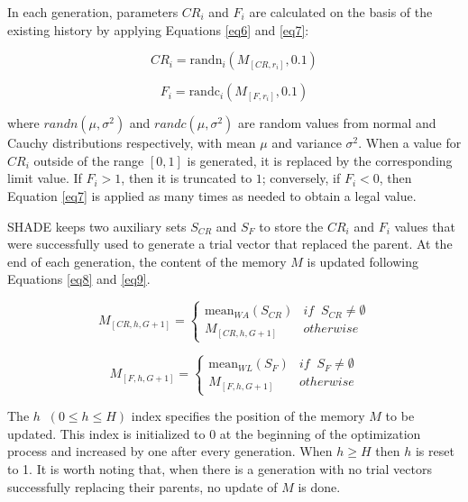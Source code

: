 \documentclass[review]{elsarticle}
\begin{document}
In each generation, parameters $CR_i$ and $F_i$ are calculated on the basis of the existing history by applying Equations \eqref{eq6} and \eqref{eq7}:

\begin{equation}
CR_i = \text{randn}_i(M_{[CR,r_i]}, 0.1)
\label{eq6}
\end{equation}

\begin{equation}
F_i = \text{randc}_i(M_{[F,r_i]}, 0.1)
\label{eq7}
\end{equation}

where $randn(\mu, \sigma^2)$ and $randc(\mu, \sigma^2)$ are random values from normal and Cauchy distributions respectively, with mean $\mu$ and variance $\sigma^2$. When a value for $CR_i$ outside of the range $[0,1]$ is generated, it is replaced by the corresponding limit value. If $F_i > 1$, then it is truncated to $1$; conversely, if $F_i < 0$, then Equation \eqref{eq7} is applied as many times as needed to obtain a legal value.

SHADE keeps two auxiliary sets $S_{CR}$ and $S_F$ to store the $CR_i$ and $F_i$ values that were successfully used to generate a trial vector that replaced the parent. At the end of each generation, the content of the memory $M$ is updated following Equations \eqref{eq8} and \eqref{eq9}.

\begin{equation}
M_{[CR,h,G+1]} = \left\{ \begin{array}{lc}
\text{mean}_{WA} (S_{CR}) &   if \;\; S_{CR} \neq \emptyset \\
M_{[CR,h,G+1]} &  otherwise
\end{array}
\right.
\label{eq8}
\end{equation}

\begin{equation}
M_{[F,h,G+1]} = \left\{ \begin{array}{lc}
\text{mean}_{WL} (S_{F}) &   if \;\; S_{F} \neq \emptyset \\
M_{[F,h,G+1]} &  otherwise
\end{array}
\right.
\label{eq9}
\end{equation}

The $h \;\; (0 \le h \le H)$ index specifies the position of the memory $M$ to be updated. This index is initialized to $0$ at the beginning of the optimization process and increased by one after every generation. When $h \ge H$ then $h$ is reset to 1. It is worth noting that, when there is a generation with no trial vectors successfully replacing their parents, no update of $M$ is done.
\end{document}
